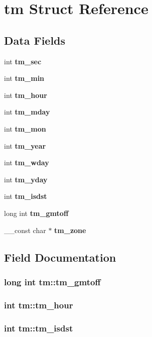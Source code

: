 \section{tm Struct Reference}
\label{structtm}
\subsection*{Data Fields}
\begin{DoxyCompactItemize}
\item 
int {\bf tm\_\-sec}
\item 
int {\bf tm\_\-min}
\item 
int {\bf tm\_\-hour}
\item 
int {\bf tm\_\-mday}
\item 
int {\bf tm\_\-mon}
\item 
int {\bf tm\_\-year}
\item 
int {\bf tm\_\-wday}
\item 
int {\bf tm\_\-yday}
\item 
int {\bf tm\_\-isdst}
\item 
long int {\bf tm\_\-gmtoff}
\item 
\_\-\_\-const char $\ast$ {\bf tm\_\-zone}
\end{DoxyCompactItemize}


\subsection{Field Documentation}
\subsubsection[{tm\_\-gmtoff}]{\setlength{\rightskip}{0pt plus 5cm}long int {\bf tm::tm\_\-gmtoff}}\label{structtm_ab76d309569eaf7b4e3c777430086f362}
\subsubsection[{tm\_\-hour}]{\setlength{\rightskip}{0pt plus 5cm}int {\bf tm::tm\_\-hour}}\label{structtm_a3e7ca4e37f1abcaf56b8a916c38eb9fe}
\subsubsection[{tm\_\-isdst}]{\setlength{\rightskip}{0pt plus 5cm}int {\bf tm::tm\_\-isdst}}\label{structtm_a5645ca0580c8ab2c24f6c2965d9c9f9c}
